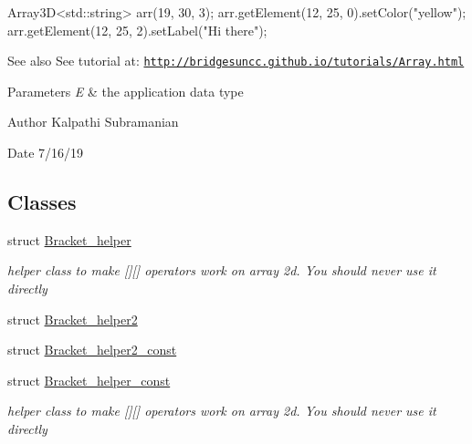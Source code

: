\begin{DoxyCode}
Array3D<std::string> arr(19, 30, 3);
arr.getElement(12, 25, 0).setColor(\textcolor{stringliteral}{"yellow"});
arr.getElement(12, 25, 2).setLabel(\textcolor{stringliteral}{"Hi there"});
\end{DoxyCode}


\begin{DoxySeeAlso}{See also}
See tutorial at\+: \href{http://bridgesuncc.github.io/tutorials/Array.html}{\tt http\+://bridgesuncc.\+github.\+io/tutorials/\+Array.\+html}
\end{DoxySeeAlso}

\begin{DoxyParams}{Parameters}
{\em E} & the application data type\\
\hline
\end{DoxyParams}
\begin{DoxyAuthor}{Author}
Kalpathi Subramanian 
\end{DoxyAuthor}
\begin{DoxyDate}{Date}
7/16/19 
\end{DoxyDate}
\subsection*{Classes}
\begin{DoxyCompactItemize}
\item 
struct \mbox{\hyperlink{structbridges_1_1datastructure_1_1_array3_d_1_1_bracket__helper}{Bracket\+\_\+helper}}
\begin{DoxyCompactList}\small\item\em helper class to make \mbox{[}\mbox{]}\mbox{[}\mbox{]} operators work on array 2d. You should never use it directly \end{DoxyCompactList}\item 
struct \mbox{\hyperlink{structbridges_1_1datastructure_1_1_array3_d_1_1_bracket__helper2}{Bracket\+\_\+helper2}}
\item 
struct \mbox{\hyperlink{structbridges_1_1datastructure_1_1_array3_d_1_1_bracket__helper2__const}{Bracket\+\_\+helper2\+\_\+const}}
\item 
struct \mbox{\hyperlink{structbridges_1_1datastructure_1_1_array3_d_1_1_bracket__helper__const}{Bracket\+\_\+helper\+\_\+const}}
\begin{DoxyCompactList}\small\item\em helper class to make \mbox{[}\mbox{]}\mbox{[}\mbox{]} operators work on array 2d. You should never use it directly \end{DoxyCompactList}\end{DoxyCompactItemize}
